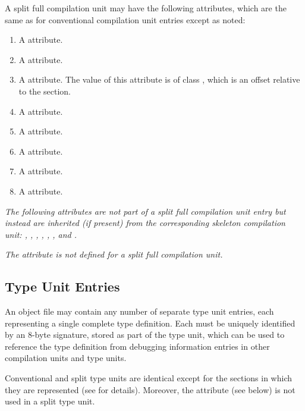 A split full compilation unit 
may have the following attributes, 
which are the same as for conventional compilation unit entries 
except as noted:
\begin{enumerate}[1. ]
\item A \DWATname{} attribute.
\item A \DWATlanguage{} attribute.
\item A \DWATmacros{} attribute.
The value of this attribute is of class \CLASSmacptr{}, which is 
an offset relative to the \dotdebugmacrodwo{} section.
        
\item A \DWATproducer{} attribute.        
\item A \DWATidentifiercase{} attribute.
\item A \DWATmainsubprogram{} attribute.
\item A \DWATentrypc{} attribute.
\item A \DWATuseUTFeight{} attribute.

\end{enumerate}

\textit{The following attributes are not part of a 
split full compilation unit entry but instead are inherited 
(if present) from the corresponding skeleton compilation unit: 
\DWATlowpc, \DWAThighpc, \DWATranges, \DWATstmtlist, \DWATcompdir, 
\DWATstroffsetsbase, \DWATaddrbase{} and 
\DWATrangesbase.}

\textit{The \DWATbasetypes{} attribute is not defined for a
split full compilation unit.}


\subsection{Type Unit Entries}
\label{chap:typeunitentries}
An object file may contain any number of separate type
unit entries, each representing a single complete type
definition. 
Each  must be uniquely identified by
an 8-byte signature, stored as part of the type unit, which
can be used to reference the type definition from debugging
information entries in other compilation units and type units.

Conventional and split type units are identical except for
the sections in which they are represented 
(see  for details).
Moreover, the \DWATstroffsetsbase{} attribute (see below) is not 
used in a split type unit.


